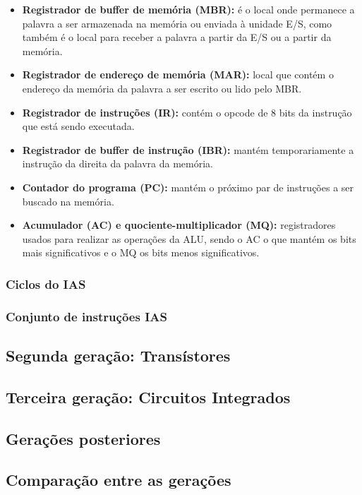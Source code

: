 \documentclass{article}
\begin{document}
\begin{itemize}
    \item \textbf{Registrador de buffer de memória (MBR):} é o local onde permanece
        a palavra a ser armazenada na memória ou enviada à unidade E/S,
        como também é o local para receber a palavra a partir da E/S ou a
        partir da memória.
    \item \textbf{Registrador de endereço de memória (MAR):} local que contém o
        endereço da memória da palavra a ser escrito ou lido pelo MBR.
    \item \textbf{Registrador de instruções (IR):} contém o opcode de 8 bits da
        instrução que está sendo executada.
    \item \textbf{Registrador de buffer de instrução (IBR):} mantém temporariamente
        a instrução da direita da palavra da memória.
    \item \textbf{Contador do programa (PC):} mantém o próximo par de instruções a
        ser buscado na memória.
    \item \textbf{Acumulador (AC) e quociente-multiplicador (MQ):} registradores
        usados para realizar as operações da ALU, sendo o AC o que mantém
        os bits mais significativos e o MQ os bits menos significativos.
\end{itemize}

\subsubsection{Ciclos do IAS}
\subsubsection{Conjunto de instruções IAS}
\subsection{Segunda geração: Transístores}
\subsection{Terceira geração: Circuitos Integrados}
\subsection{Gerações posteriores}
\subsection{Comparação entre as gerações}
\end{document}

